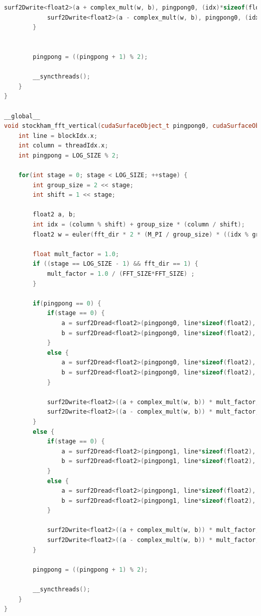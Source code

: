 \documentclass[
  oneside,
  11pt, a4paper,
  footinclude=true,
  headinclude=true,
  cleardoublepage=empty
]{scrbook}
\begin{document}
\begin{lstlisting}[language=C++,caption={FFT Radix-2 Cooley-Tukey, see \autoref{sec:implementation-analysis-in-cuda}},label={lst:cuda-radix2-ct}]
            surf2Dwrite<float2>(a + complex_mult(w, b), pingpong0, (idx)*sizeof(float2), column);
            surf2Dwrite<float2>(a - complex_mult(w, b), pingpong0, (idx+shift)*sizeof(float2), column);
        }
        

        pingpong = ((pingpong + 1) % 2);

        __syncthreads();
    }
}

__global__
void stockham_fft_vertical(cudaSurfaceObject_t pingpong0, cudaSurfaceObject_t pingpong1, float fft_dir) {
    int line = blockIdx.x;
    int column = threadIdx.x;
    int pingpong = LOG_SIZE % 2;

    for(int stage = 0; stage < LOG_SIZE; ++stage) {
        int group_size = 2 << stage;
        int shift = 1 << stage;

        float2 a, b;
        int idx = (column % shift) + group_size * (column / shift);
        float2 w = euler(fft_dir * 2 * (M_PI / group_size) * ((idx % group_size) % shift));

        float mult_factor = 1.0;
        if ((stage == LOG_SIZE - 1) && fft_dir == 1) {
            mult_factor = 1.0 / (FFT_SIZE*FFT_SIZE) ;
        }

        if(pingpong == 0) {
            if(stage == 0) {
                a = surf2Dread<float2>(pingpong0, line*sizeof(float2), bit_reverse(idx));
                b = surf2Dread<float2>(pingpong0, line*sizeof(float2), bit_reverse(idx+shift));
            }
            else {
                a = surf2Dread<float2>(pingpong0, line*sizeof(float2), idx);
                b = surf2Dread<float2>(pingpong0, line*sizeof(float2), idx+shift);
            }

            surf2Dwrite<float2>((a + complex_mult(w, b)) * mult_factor, pingpong1, line*sizeof(float2), idx);
            surf2Dwrite<float2>((a - complex_mult(w, b)) * mult_factor, pingpong1, line*sizeof(float2), idx+shift);
        }
        else {
            if(stage == 0) {
                a = surf2Dread<float2>(pingpong1, line*sizeof(float2), bit_reverse(idx));
                b = surf2Dread<float2>(pingpong1, line*sizeof(float2), bit_reverse(idx+shift));
            }
            else {
                a = surf2Dread<float2>(pingpong1, line*sizeof(float2), idx);
                b = surf2Dread<float2>(pingpong1, line*sizeof(float2), idx+shift);
            }

            surf2Dwrite<float2>((a + complex_mult(w, b)) * mult_factor, pingpong0, line*sizeof(float2), idx);
            surf2Dwrite<float2>((a - complex_mult(w, b)) * mult_factor, pingpong0, line*sizeof(float2), idx+shift);
        }
        
        pingpong = ((pingpong + 1) % 2);

        __syncthreads();
    }
}
\end{lstlisting}
\end{document}
